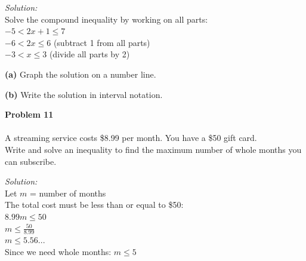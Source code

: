 \documentclass[12pt]{article}
\begin{document}
            \textit{Solution:}\\
            Solve the compound inequality by working on all parts:\\
            $-5 < 2x + 1 \leq 7$\\
            $-6 < 2x \leq 6$ \quad (subtract 1 from all parts)\\
            $-3 < x \leq 3$ \quad (divide all parts by 2)


            \textbf{(a)} Graph the solution on a number line.

            \begin{center}
            \end{center}

            \textbf{(b)} Write the solution in interval notation.

            \fbox{Answer: $(-3, 3]$}

            \newpage

            \textbf{Problem 11}\\\\
            A streaming service costs \$8.99 per month. You have a \$50 gift card.\\
            Write and solve an inequality to find the maximum number of whole months you can subscribe.

            \textit{Solution:}\\
            Let $m$ = number of months\\
            The total cost must be less than or equal to \$50:\\
            $8.99m \leq 50$\\
            $m \leq \displaystyle\frac{50}{8.99}$\\
            $m \leq 5.56...$\\
            Since we need whole months: $m \leq 5$

\end{document}
